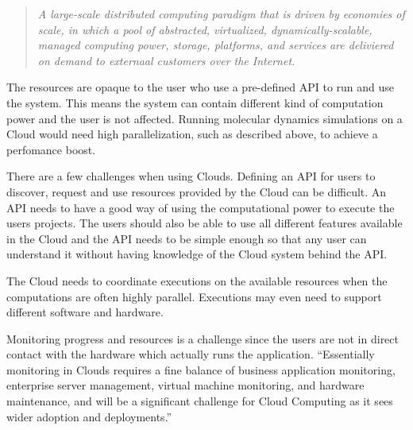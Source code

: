 \begin{quote} \slshape
  A large-scale distributed computing paradigm that is driven by
  economies of scale, in which a pool of abstracted, virtualized,
  dynamically-scalable, managed computing power, storage, platforms,
  and services are deliviered on demand to externaal customers over
  the Internet.
\end{quote}

The resources are opaque to the user who use a pre-defined API to run
and use the system. This means the system can contain different kind
of computation power and the user is not affected. Running molecular
dynamics simulations on a Cloud would need high parallelization, such
as described above, to achieve a perfomance boost.



There are a few challenges when using Clouds. Defining an API for
users to discover, request and use resources provided by the Cloud can
be difficult. An API needs to have a good way of using the
computational power to execute the users projects. The users should
also be able to use all different features available in the Cloud and
the API needs to be simple enough so that any user can understand it
without having knowledge of the Cloud system behind the API.

The Cloud needs to coordinate executions on the available resources
when the computations are often highly parallel. Executions may even
need to support different software and hardware.



Monitoring progress and resources is a challenge since the users are
not in direct contact with the hardware which actually runs the
application. ``Essentially monitoring in Clouds requires a fine
balance of business application monitoring, enterprise server
management, virtual machine monitoring, and hardware maintenance, and
will be a significant challenge for Cloud Computing as it sees wider
adoption and deployments.''\citep{foster:2008}

